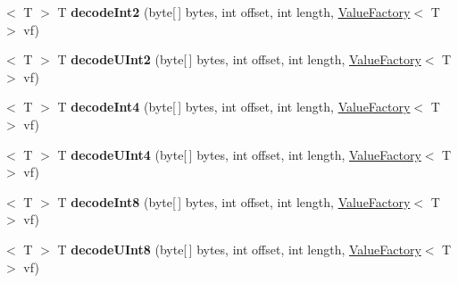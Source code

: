 \begin{DoxyCompactItemize}
\mbox{\label{interfacecom_1_1mysql_1_1cj_1_1protocol_1_1_value_decoder_abe158670a28e6976e124afee59423762}} 
$<$ T $>$ T {\bfseries decode\+Int2} (byte\mbox{[}$\,$\mbox{]} bytes, int offset, int length, \mbox{\hyperlink{interfacecom_1_1mysql_1_1cj_1_1result_1_1_value_factory}{Value\+Factory}}$<$ T $>$ vf)
\item 
\mbox{\label{interfacecom_1_1mysql_1_1cj_1_1protocol_1_1_value_decoder_a57d0922a5efca890bb010f61a70974ed}} 
$<$ T $>$ T {\bfseries decode\+U\+Int2} (byte\mbox{[}$\,$\mbox{]} bytes, int offset, int length, \mbox{\hyperlink{interfacecom_1_1mysql_1_1cj_1_1result_1_1_value_factory}{Value\+Factory}}$<$ T $>$ vf)
\item 
\mbox{\label{interfacecom_1_1mysql_1_1cj_1_1protocol_1_1_value_decoder_a6236420972df8897f8ccedd437bfdd7d}} 
$<$ T $>$ T {\bfseries decode\+Int4} (byte\mbox{[}$\,$\mbox{]} bytes, int offset, int length, \mbox{\hyperlink{interfacecom_1_1mysql_1_1cj_1_1result_1_1_value_factory}{Value\+Factory}}$<$ T $>$ vf)
\item 
\mbox{\label{interfacecom_1_1mysql_1_1cj_1_1protocol_1_1_value_decoder_a7f79158fa5e70cfb237a32a43a79b29a}} 
$<$ T $>$ T {\bfseries decode\+U\+Int4} (byte\mbox{[}$\,$\mbox{]} bytes, int offset, int length, \mbox{\hyperlink{interfacecom_1_1mysql_1_1cj_1_1result_1_1_value_factory}{Value\+Factory}}$<$ T $>$ vf)
\item 
\mbox{\label{interfacecom_1_1mysql_1_1cj_1_1protocol_1_1_value_decoder_a59cd56f90ab86eab7f0108f20b73f108}} 
$<$ T $>$ T {\bfseries decode\+Int8} (byte\mbox{[}$\,$\mbox{]} bytes, int offset, int length, \mbox{\hyperlink{interfacecom_1_1mysql_1_1cj_1_1result_1_1_value_factory}{Value\+Factory}}$<$ T $>$ vf)
\item 
\mbox{\label{interfacecom_1_1mysql_1_1cj_1_1protocol_1_1_value_decoder_aa27f53c4c6f0933ac3a74a90c3071297}} 
$<$ T $>$ T {\bfseries decode\+U\+Int8} (byte\mbox{[}$\,$\mbox{]} bytes, int offset, int length, \mbox{\hyperlink{interfacecom_1_1mysql_1_1cj_1_1result_1_1_value_factory}{Value\+Factory}}$<$ T $>$ vf)

\end{DoxyCompactItemize}
